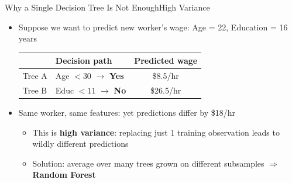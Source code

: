 \documentclass[hyperref={pdfpagelabels=false}]{beamer}
\begin{document}
\begin{frame}{Why a Single Decision Tree Is Not Enough}{High Variance}
\begin{itemize}

\item Suppose we want to predict new worker's wage: Age = 22, Education = 16 years
\vspace{0.2cm}

\begin{center}
 
  \small
  \begin{tabular}{@{}llc@{}}
    \toprule
     & Decision path & Predicted wage \\
    \midrule
    Tree A & Age $< 30$ $\to$ \textbf{Yes} & \$8.5/hr \\
    Tree B & Educ $< 11$ $\to$ \textbf{No} & \$26.5/hr \\
    \bottomrule
  \end{tabular}
\end{center}

\vspace{0.2cm}

  \item Same worker, same features: yet predictions differ by \$18/hr
  \begin{itemize}

  \vspace{0.2cm}

  \item This is \textbf{high variance}: replacing just 1 training observation leads to wildly different predictions
  \vspace{0.2cm}

  \item Solution: average over many trees grown on different subsamples $\Rightarrow$ \textbf{Random Forest}
  \end{itemize}

\end{itemize}
\end{frame}
\end{document}
